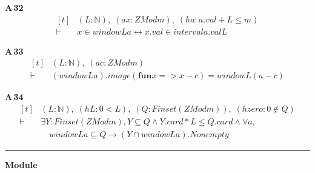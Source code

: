 \noindent\textbf{A\,32}\quad{}
{\footnotesize\[ \begin{aligned}[t]
&(\mathit{L} : \mathbb{N} ),\; (\mathit{a} \mathit{x} : \mathit{ZMod} \mathit{m}),\; (\mathit{ha} : \mathit{a}.\mathit{val}+\mathit{L} \leq \mathit{m})\\
\vdash\;&\mathit{x} \in \mathit{window} \mathit{L} \mathit{a} \leftrightarrow \mathit{x}.\mathit{val} \in \mathit{interval} \mathit{a}.\mathit{val} \mathit{L}
\end{aligned} \]}

\noindent\textbf{A\,33}\quad{}
{\footnotesize\[ \begin{aligned}[t]
&(\mathit{L} : \mathbb{N} ),\; (\mathit{a} \mathit{c} : \mathit{ZMod} \mathit{m})\\
\vdash\;&(\mathit{window} \mathit{L} \mathit{a}).\mathit{image} (\mathbf{fun} \mathit{x} => \mathit{x}-\mathit{c})=\mathit{window} \mathit{L} (\mathit{a}-\mathit{c})
\end{aligned} \]}

\noindent\textbf{A\,34}\quad{}
{\footnotesize\[ \begin{aligned}[t]
&(\mathit{L} : \mathbb{N} ),\; (\mathit{hL} : 0<\mathit{L}),\; (\mathit{Q} : \mathit{Finset} (\mathit{ZMod} \mathit{m})),\; (\mathit{hzero} : 0 \notin \mathit{Q})\\
\vdash\;&\exists \mathit{Y} : \mathit{Finset} (\mathit{ZMod} \mathit{m}),\mathit{Y} \subseteq \mathit{Q} \wedge \mathit{Y}.\mathit{card}*\mathit{L} \leq \mathit{Q}.\mathit{card} \wedge \forall \mathit{a},\\
&\quad \mathit{window} \mathit{L} \mathit{a} \subseteq \mathit{Q} \to (\mathit{Y} \cap \mathit{window} \mathit{L} \mathit{a}).\mathit{Nonempty}
\end{aligned} \]}

\vspace{4pt}\noindent\rule{\columnwidth}{0.4pt}\par\vspace{2pt}
\noindent\textbf{Module }\par\vspace{3pt}

